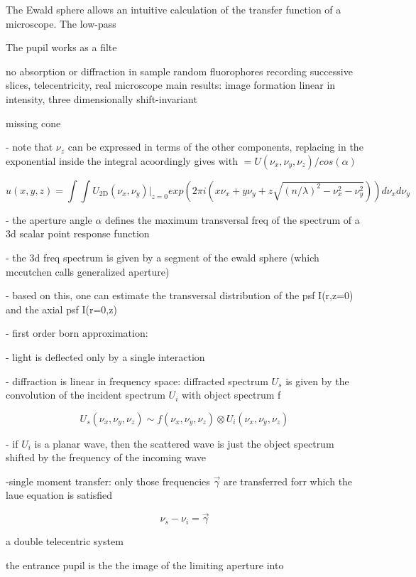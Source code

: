 The Ewald sphere allows an intuitive calculation of the transfer
function of a microscope. The low-pass 

The pupil works as a filte




no absorption or diffraction in sample
random fluorophores
recording successive slices, telecentricity, real microscope 
main results: image formation linear in intensity, three dimensionally shift-invariant

missing cone \cite{Streibl1984}


- note that $\nu_z$ can be expressed in terms of the other components,
  replacing in the exponential inside the integral acoordingly gives
  with $= U(\nu_x,\nu_y,\nu_z)/cos(\alpha)$

$$ u(x,y,z)=\int\int U_\textrm{2D}(\nu_x,\nu_y)|_{z=0}  exp(2\pi i (x \nu_x+y\nu_y+z\sqrt{(n/\lambda)^2-\nu_x^2-\nu_y^2})) d \nu_x d \nu_y$$

- the aperture angle $\alpha$ defines the maximum transversal freq of
   the spectrum of a 3d scalar point response function

- the 3d freq spectrum is given by a segment of the ewald sphere
  (which mccutchen calls generalized aperture)

- based on this, one can estimate the transversal distribution of the
  psf I(r,z=0) and the axial psf I(r=0,z)

- first order born approximation:

    - light is deflected only by a single interaction 

    - diffraction is linear in frequency space: diffracted spectrum $U_s$ is
      given by the convolution of the incident spectrum $U_i$ with object
      spectrum f

$$U_s(\nu_x,\nu_y,\nu_z) \sim f(\nu_x,\nu_y,\nu_z) \otimes U_i(\nu_x,\nu_y,\nu_z)$$

    - if $U_i$ is a planar wave, then the scattered wave is just the
      object spectrum shifted by the frequency of the incoming wave

    -single moment transfer: only those frequencies $\vec\gamma$ are
     transferred forr which the laue equation is satisfied

$$\nu_s-\nu_i=\vec\gamma$$





a double telecentric system



the entrance pupil is the the image of the limiting aperture into 

